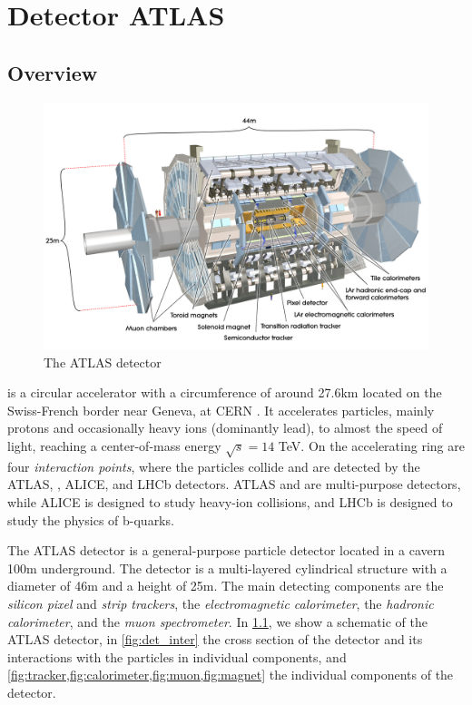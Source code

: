 \chapter{Detector ATLAS}
\label{ch:atlas}

\section{Overview}
\begin{figure}[htb]
    \centering
    \includegraphics[width=1\linewidth]{src/img/atlas.jpg}
    \caption{The ATLAS detector}
    \label{fig:atlas}
\end{figure}

\LHC is a circular accelerator with a circumference of around 27.6km located on the Swiss-French border near Geneva, at CERN \cite{cern}.
It accelerates particles, mainly protons and occasionally heavy ions (dominantly lead), to almost the speed of light, reaching a center-of-mass energy $\sqrt{s} = 14$ TeV.
On the accelerating ring are four \emph{interaction points}, where the particles collide and are detected by the ATLAS, \CMS, ALICE, and LHCb detectors.
ATLAS and \CMS are multi-purpose detectors, while ALICE is designed to study heavy-ion collisions, and LHCb is designed to study the physics of b-quarks.


The ATLAS detector \cite{ATLAS} is a general-purpose particle detector located in a cavern 100m underground.
The detector is a multi-layered cylindrical structure with a diameter of 46m and a height of 25m.
The main detecting components are the \emph{silicon pixel} and \emph{strip trackers}, the \emph{electromagnetic calorimeter}, the \emph{hadronic calorimeter}, and the \emph{muon spectrometer}.
In \cref{fig:atlas}, we show a schematic of the ATLAS detector, in \cref{fig:det_inter} the cross section of the detector and its interactions with the particles in individual components, and \cref{fig:tracker,fig:calorimeter,fig:muon,fig:magnet} the individual components of the detector.

